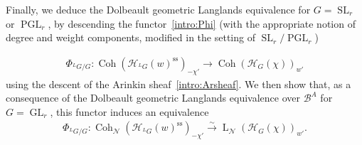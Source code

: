 \documentclass[11pt,oneside,a4paper,mathscr]{amsart}
\theoremstyle{definition}
\newcommand{\LL}{\operatorname{L}}
\newcommand{\cH}{\mathcal{H}}
\newcommand{\cB}{\mathcal{B}}
\newcommand{\Coh}{\operatorname{Coh}}
\newcommand{\GL}{\operatorname{GL}}
\newcommand{\SL}{\operatorname{SL}}
\newcommand{\PGL}{\operatorname{PGL}}
\begin{document}
Finally, we deduce the Dolbeault geometric Langlands equivalence for
$G=\SL_r$ or $\PGL_r$, by descending the functor~\eqref{intro:Phi}
(with the appropriate notion of degree and weight components, modified in the setting of $\SL_r/\PGL_r$)

\begin{align*}
    \Phi_{^{L}G/G} \colon
    \Coh(\cH_{^{L}G}(w)^{\mathrm{ss}})_{-\chi'}
    \to \Coh(\cH_G(\chi))_{w'}
\end{align*}
using the descent of the Arinkin sheaf~\eqref{intro:Arsheaf}. We then
show that, as a consequence of the Dolbeault geometric Langlands
equivalence over $\cB^A$ for $G=\GL_r$, this functor induces an
equivalence
\begin{align*}
    \Phi_{^{L}G/G} \colon
    \Coh_{\mathcal{N}}(\cH_{^{L}G}(w)^{\mathrm{ss}})_{-\chi'}
    \stackrel{\sim}{\to}
    \LL_{\mathcal{N}}(\cH_G(\chi))_{w'}.
\end{align*}
\end{document}
